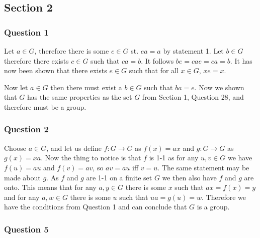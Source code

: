 \documentclass{article}
\begin{document}
\subsection{Section 2}
\subsubsection{Question 1}

Let $a\in G$, therefore there is some $e\in G$ st. $ea = a$ by statement 1. Let $b \in G$ therefore there exists $c\in G$ such that $ca = b$. It follows $be = cae = ca = b$. It has now been shown that there exists $e \in G$ such that for all $x \in G$, $xe = x$.

Now let $a\in G$ then there must exist a $b\in G$ such that $ba = e$. Now we shown that $G$ has the same properties as the set $G$ from Section 1, Question 28, and therefore must be a group.

\subsubsection{Question 2}

Choose $a \in G$, and let us define $f:G\to G$ as $f(x) = ax$ and $g:G\to G$ as $g(x) = xa$. Now the thing to notice is that $f$ is 1-1 as for any $u,v \in G$ we have $f(u) = au$ and $f(v) = av$, so $av = au$ iff $v=u$. The same statement may be made about $g$. As $f$ and $g$ are 1-1 on a finite set $G$ we then also have $f$ and $g$ are onto. This means that for any $a,y\in G$ there is some $x$ such that $ax = f(x) = y$ and for any $a,w\in G$ there is some $u$ such that $ua = g(u) = w$. Therefore we have the conditions from Question 1 and can conclude that $G$ is a group.

\subsubsection{Question 5}
\end{document}
